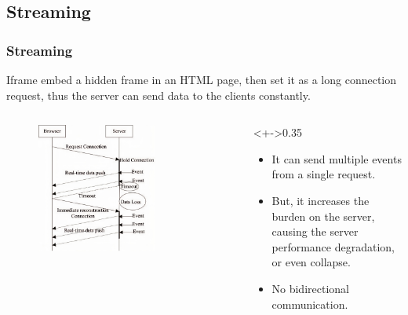 \documentclass{beamer}
\begin{document}
\subsection{Streaming}
\begin{frame}
    \frametitle{Streaming}
    Iframe embed a hidden frame in an HTML page, then set it as a long connection request, thus the server can send data to the clients constantly.
    \begin{columns}
        \begin{column}{0.7\textwidth}
            \begin{figure}
                \includegraphics[width=0.7\textwidth]{images/streaming.jpeg}
            \end{figure}
        \end{column}
        \begin{column}<+->{0.35\textwidth}
            \begin{itemize}[<+->]
                \item It can send {\color{green} multiple events} from a {\color{green} single
                              request}.
                \item But, it increases the \alert{burden on the server}, causing the server
                      \alert{performance degradation}, or even collapse. 
                \item \alert{No bidirectional communication}.
            \end{itemize}
        \end{column}
    \end{columns}
\end{frame}
\end{document}
